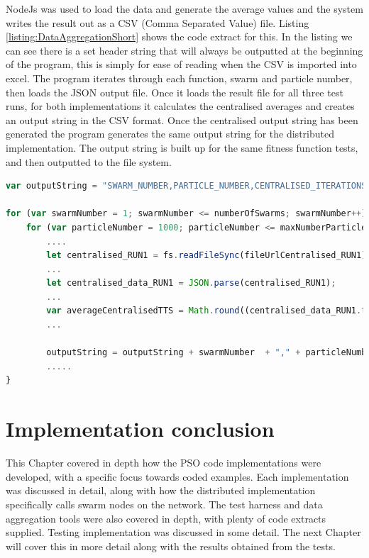 \documentclass[oneside,12pt]{book}
\begin{document}
NodeJs was used to load the data and generate the average values and the system writes the result out as a CSV (Comma Separated Value) file. Listing \ref{listing:DataAggregationShort} shows the code extract for this. In the listing we can see there is a set header string that will always be outputted at the beginning of the program, this is simply for ease of reading when the CSV is imported into excel. The program iterates through each function, swarm and particle number, then loads the JSON output file. Once it loads the result file for all three test runs, for both implementations it calculates the centralised averages and creates an output string in the CSV format. Once the centralised output string has been generated the program generates the same output string for the distributed implementation. The output string is built up for the same fitness function tests, and then outputted to the file system. 

\begin{lstlisting}[basicstyle=\footnotesize, language=JavaScript]
var outputString = "SWARM_NUMBER,PARTICLE_NUMBER,CENTRALISED_ITERATIONS,CENTRALISED_TIME_TO_SOLUTION,CENTRALISED_FINAL_GROUP_BEST,DISTRIBUTED_ITERATIONS,DISTRIBUTED_TIME_TO_SOLUTION,DISTRIBUTED_FINAL_GROUP_BEST\n";

for (var swarmNumber = 1; swarmNumber <= numberOfSwarms; swarmNumber++) {
    for (var particleNumber = 1000; particleNumber <= maxNumberParticles; particleNumber += particleIncrement) {
        ....
        let centralised_RUN1 = fs.readFileSync(fileUrlCentralised_RUN1);
        ...
        let centralised_data_RUN1 = JSON.parse(centralised_RUN1);
        ...
        var averageCentralisedTTS = Math.round((centralised_data_RUN1.timeToSolution + centralised_data_RUN2.timeToSolution + centralised_data_RUN3.timeToSolution)/3);
        ...

        outputString = outputString + swarmNumber  + "," + particleNumber + "," + averageCentralisedIterations + "," + averageCentralisedTTS + "," + averageCentralisedGbest + ",";
        .....
}
\end{lstlisting}
\label{listing:DataAggregationShort}

\section{Implementation conclusion}
This Chapter covered in depth how the PSO code implementations were developed, with a specific focus towards coded examples. Each implementation was discussed in detail, along with how the distributed implementation specifically calls swarm nodes on the network. The test harness and data aggregation tools were also covered in depth, with plenty of code extracts supplied. Testing implementation was discussed in some detail. The next Chapter will cover this in more detail along with the results obtained from the tests.
\end{document}

